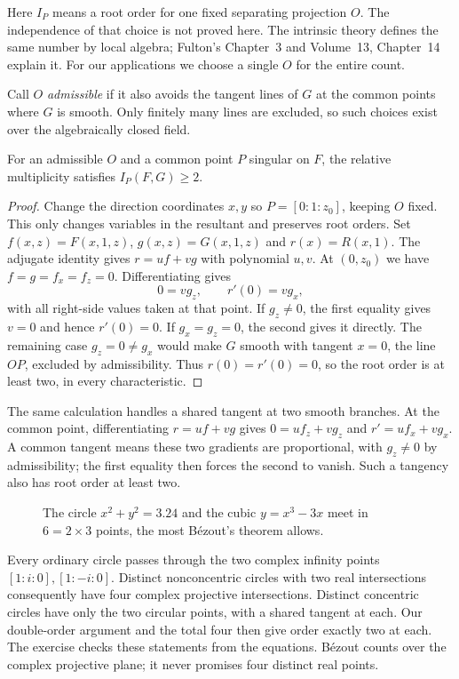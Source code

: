 Here $I_P$ means a root order for one fixed separating projection $O$. The independence of that choice is not proved here. The intrinsic theory defines the same number by local algebra; Fulton's Chapter~3 and Volume~13, Chapter~14 explain it. For our applications we choose a single $O$ for the entire count.

Call $O$ \emph{admissible} if it also avoids the tangent lines of $G$ at the common points where $G$ is smooth. Only finitely many lines are excluded, so such choices exist over the algebraically closed field.

\begin{lemma}\label{geometry:lem:singularmult}
For an admissible $O$ and a common point $P$ singular on $F$, the relative multiplicity satisfies $I_P(F,G)\ge2$.
\end{lemma}
\begin{proof}
Change the direction coordinates $x,y$ so $P=[0:1:z_0]$, keeping $O$ fixed. This only changes variables in the resultant and preserves root orders. Set $f(x,z)=F(x,1,z)$, $g(x,z)=G(x,1,z)$ and $r(x)=R(x,1)$. The adjugate identity gives $r=uf+vg$ with polynomial $u,v$. At $(0,z_0)$ we have $f=g=f_x=f_z=0$. Differentiating gives
\[
0=vg_z,\qquad r'(0)=vg_x,
\]
with all right-side values taken at that point. If $g_z\ne0$, the first equality gives $v=0$ and hence $r'(0)=0$. If $g_x=g_z=0$, the second gives it directly. The remaining case $g_z=0\ne g_x$ would make $G$ smooth with tangent $x=0$, the line $OP$, excluded by admissibility. Thus $r(0)=r'(0)=0$, so the root order is at least two, in every characteristic.
\end{proof}

The same calculation handles a shared tangent at two smooth branches. At the common point, differentiating $r=uf+vg$ gives $0=uf_z+vg_z$ and $r'=uf_x+vg_x$. A common tangent means these two gradients are proportional, with $g_z\ne0$ by admissibility; the first equality then forces the second to vanish. Such a tangency also has root order at least two.

\begin{figure}[ht]
\centering
{}
\caption{The circle $x^2+y^2=3.24$ and the cubic $y=x^3-3x$ meet in $6=2\times3$ points, the most B\'ezout's theorem allows.}
\label{geometry:fig:bezout}
\end{figure}

Every ordinary circle passes through the two complex infinity points $[1:i:0],[1:-i:0]$. Distinct nonconcentric circles with two real intersections consequently have four complex projective intersections. Distinct concentric circles have only the two circular points, with a shared tangent at each. Our double-order argument and the total four then give order exactly two at each. The exercise checks these statements from the equations. B\'ezout counts over the complex projective plane; it never promises four distinct real points.

